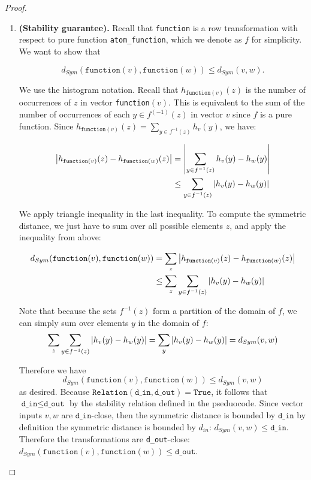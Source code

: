 \documentclass[11pt,a4paper]{article}
\newcommand{\din}{\texttt{d\_in}}
\newcommand{\dout}{\texttt{d\_out}}
\newcommand{\Relation}{\texttt{Relation}}
\newcommand{\function}{\texttt{function}}
\begin{document}
\begin{proof}
\begin{enumerate}
\item \textbf{(Stability guarantee).} 
Recall that \texttt{function} is a row transformation with respect to pure function \texttt{atom\_function}, which we denote as $f$ for simplicity. We want to show that

$$d_{Sym}(\texttt{function}(v), \texttt{function}(w)) \leq d_{Sym}(v, w).$$

We use the histogram notation. Recall that $h_{\texttt{function}(v)}(z)$ is the number of occurrences of $z$ in vector \texttt{function}$(v)$. This is equivalent to the sum of the number of occurrences of each $y \in f^{(-1)}(z)$ in vector $v$ since $f$ is a pure function. Since $h_{\texttt{function}(v)}(z) = \sum_{y \in f^{-1}(z)} h_v(y)$, we have:

\begin{align*}
    \abs{h_{\texttt{function}(v)}(z) - h_{\texttt{function}(w)}(z)} &= \abs{\sum_{y \in f^{-1}(z)} h_v(y) - h_w(y)}\\
    &\leq \sum_{y \in f^{-1}(z)} \abs{h_v(y) - h_w(y)}
\end{align*}


We apply triangle inequality in the last inequality.
To compute the symmetric distance, we just have to sum over all possible elements $z$, and apply the inequality from above:

\begin{align*}
    d_{Sym}(\texttt{function}(v), \texttt{function}(w)) &= 
    \sum_z \abs{h_{\texttt{function}(v)}(z) - h_{\texttt{function}(w)}(z)} \\
    &\leq \sum_z \sum_{y \in f^{-1}(z)} \abs{h_v(y) - h_w(y)}\\
\end{align*}

Note that because the sets $f^{-1}(z)$ form a partition of the domain of $f$, we can simply sum over elements $y$ in the domain of $f$: $$\sum_z \sum_{y \in f^{-1}(z)} \abs{h_v(y) - h_w(y)} = \sum_y \abs{h_{v}(y) - h_{w}(y)} = d_{Sym}(v, w)$$

Therefore we have $$d_{Sym}(\texttt{function}(v), \texttt{function}(w)) \leq d_{Sym}(v, w)$$ as desired.
Because $\Relation(\din, \dout) = \texttt{True}$, it follows that $\din \leq \dout$ by the stability relation defined in the pseduocode. Since vector inputs $v, w$ are $\din$-close, then the symmetric distance is bounded by $\din$ by definition the symmetric distance is bounded by $d_{in}$: $d_{Sym}(v, w) \leq \din$. Therefore the transformations are \dout-close: $d_{Sym}(\function(v), \function(w)) \leq \dout$.
\end{enumerate}
\end{proof}
\end{document}
